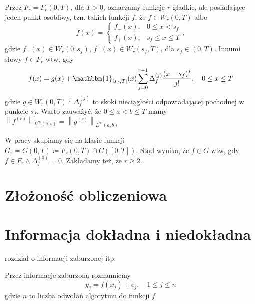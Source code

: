 \documentclass[oik, pdftex, robocza, man]{mgrwms}
\begin{document}
Przez $F_{r} = F_{r}(0, T)$, dla $T > 0$, oznaczamy funkcje $r$-gładkie, ale posiadające jeden punkt osobliwy, tzn. takich funkcji $f$, że $f \in W_{r}(0,T)$ albo
\begin{equation*}
    f(x)= \begin{cases}f_{-}(x), & 0 \leq x<s_{f} \\ f_{+}(x), & s_{f} \leq x \leq T\end{cases},
\end{equation*}
gdzie $f_{-}(x) \in W_{r}(0, s_{f})$, $f_{+}(x) \in W_{r}(s_{f}, T)$, dla $s_{f} \in (0,T)$. Innumi słowy $f \in F_{r}$ wtw, gdy
\begin{equation*}
    f(x)=g(x)+\mathbbm{1}_{\left[s_{f}, T\right]}(x) \sum_{j=0}^{r-1} \Delta_{f}^{(j)} \frac{\left(x-s_{f}\right)^{j}}{j !}, \quad 0 \leq x \leq T
\end{equation*}
gdzie $g \in W_{r}(0,T)$ i $\Delta_{f}^{(j)}$ to skoki nieciągłości odpowiadającej pochodnej w punkcie $s_{f}$. Warto zauważyć, że 
$0 \leq a<b \leq T$ mamy $\left\|f^{(r)}\right\|_{L^{\infty}(a, b)}=\left\|g^{(r)}\right\|_{L^{\infty}(a, b)}$

W pracy \cite{UA} skupiamy się na klasie funkcji $G_{r} = G(0,T) \coloneqq F_{r}(0,T) \cap C([0,T])$. Stąd wynika, że $f \in G$ wtw, gdy $f \in F_{r} \land \Delta_{f}^{(0)} = 0$.
Zakładamy też, że $r \geq 2$.






\mgrclosechapter


\chapter{Złożoność obliczeniowa}



\mgrclosechapter



\chapter{Informacja dokładna i niedokładna}

\noindent
rozdział o informacji zaburzonej itp.

Przez informacje zaburzoną rozmumiemy
\begin{equation*}
    y_j = f(x_j) + e_j, \quad 1 \leq j \leq n
\end{equation*}
gdzie $n$ to liczba odwołań algorytmu do funkcji $f$
\end{document}
